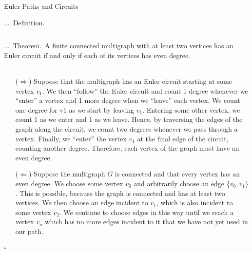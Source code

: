 \documentclass[smaller,hyperref={CJKbookmarks=true}]{beamer}
\newenvironment{PROOF}{{\noindent\!\sf\alert{Proof.}}\\}{\hfill$\square$\\}
\newcounter{zhuo}[subsection]
\renewcommand{\thezhuo}{\thesection.\thesubsection.\arabic{zhuo}}
\newenvironment{DEFINITION}{\stepcounter{zhuo}\alert{\thezhuo.~Definition.\,}}{}
\newenvironment{THEOREM}{\stepcounter{zhuo}\alert{\thezhuo.~Theorem.\,}}{}
\begin{document}
\begin{frame}{Euler Paths and Circuits}
\begin{spacing}{1.05}
\begin{DEFINITION}
\begin{columns}[onlytextwidth]
\begin{column}{0.5\textwidth}
\begin{center}
\end{center}
\end{column}
\end{columns}
\end{DEFINITION}
\end{spacing}
\newpage
\begin{spacing}{1.15}
\begin{THEOREM}
A finite connected multigraph with at least two vertices
has an Euler circuit if and only if each of its vertices has even degree.\\[6pt]
\end{THEOREM}
\begin{PROOF}
\begin{itemize}
  \item[($\Rightarrow$)] Suppose that the multigraph has an Euler circuit starting at some vertex $v_1$. We then ``follow'' the Euler circuit and count 1 degree whenever we ``enter'' a vertex and 1 more degree when we ``leave'' each vertex. We count one degree for v1 as we start by leaving $v_1$. Entering some other vertex, we count 1 as we enter and 1 as we leave. Hence, by traversing the edges of the graph along the circuit, we count two degrees whenever we pass through a vertex. Finally, we ``enter'' the vertex $v_1$ at the final edge of the circuit, counting another degree. Therefore, each vertex of the graph must have an even degree.
\newpage
  \item[($\Leftarrow$)] Suppose the multigraph $G$ is connected and that every vertex has an
even degree. We choose some vertex $v_0$ and arbitrarily choose an
edge $\{v_0, v_1\}$. This is possible, because the graph is connected and
has at least two vertices. We then choose an edge incident to $v_1$,
which is also incident to some vertex $v_2$. We continue to choose
edges in this way until we reach a vertex $v_n$ which has no more edges
incident to it that we have not yet used in our path.\\[6pt]

\end{itemize}
\end{PROOF}
\end{spacing}
\end{frame}
\end{document}
